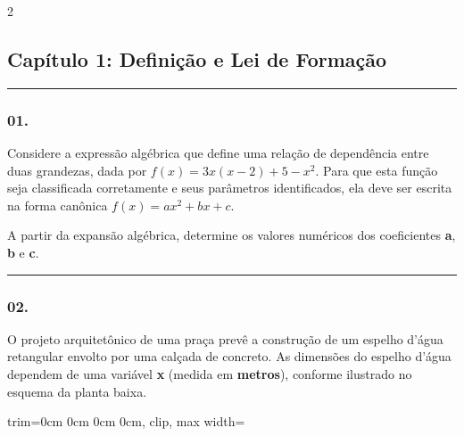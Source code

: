 \documentclass[twoside, 10pt, a4paper]{article}
\newlength{\espacoPosTitulo}
\newlength{\espacoPreQuestao}
\newlength{\espacoQuestao}
\newlength{\larguraTikz}
\begin{document}
\par\vspace{0.3cm} 
\raggedcolumns
\begin{multicols*}{2}
\vspace{0.1cm}
\subsection*{Capítulo 1: Definição e Lei de Formação}
\vspace{-0.2cm}\noindent\rule{\linewidth}{1.5pt} 
\par\vspace{\espacoPosTitulo}
\subsubsection*{01.} Considere a expressão algébrica que define uma relação de dependência entre duas grandezas, dada por $f(x) = 3x(x - 2) + 5 - x^2$. Para que esta função seja classificada corretamente e seus parâmetros identificados, ela deve ser escrita na forma canônica $f(x) = ax^2 + bx + c$.

A partir da expansão algébrica, determine os valores numéricos dos coeficientes \textbf{a}, \textbf{b} e \textbf{c}.
\par\vspace{\espacoQuestao}

\noindent\textcolor{CorLinha}{\rule{\linewidth}{0.5pt}} 
\par\vspace{\espacoPreQuestao}
\subsubsection*{02.} O projeto arquitetônico de uma praça prevê a construção de um espelho d'água retangular envolto por uma calçada de concreto. As dimensões do espelho d'água dependem de uma variável \textbf{x} (medida em \textbf{metros}), conforme ilustrado no esquema da planta baixa.

\begin{center}
\begin{adjustbox}{trim=0cm 0cm 0cm 0cm, clip, max width=\larguraTikz}
\end{adjustbox}
\end{center}
\end{multicols*}
\end{document}
